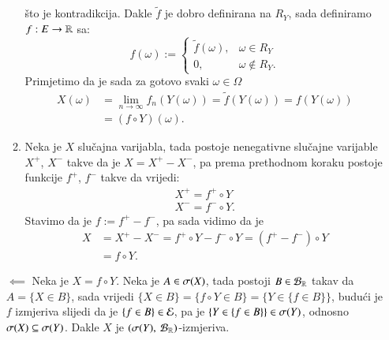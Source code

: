 \begin{rj}[\ref{zad:3.20}]
\begin{itemize}
\begin{enumerate}[label=(\arabic*. korak)]
\begin{equation*}
            \end{equation*}
            \v sto je kontradikcija.
            Dakle $\tilde{f}$ je dobro definirana na $R_Y$, sada definiramo $f : E \to \mathbb{R}$ sa:
            \begin{equation*}
                f(\omega) :=
                \begin{cases}
                    \tilde{f} (\omega), &\omega \in R_Y\\
                    0, &\omega \notin R_Y.
                \end{cases}
            \end{equation*}
            Primjetimo da je sada za gotovo svaki $\omega \in \Omega$
            \begin{equation*}
                \begin{aligned}
                X(\omega) &= \lim\limits_{n \to \infty} f_n (Y(\omega)) = \tilde{f}(Y(\omega)) = f(Y(\omega))\\
                &= (f \circ Y) (\omega).
                \end{aligned}
            \end{equation*}
            \item Neka je $X$ slu\v cajna varijabla, tada postoje nenegativne slu\v cajne varijable $X^+$, $X^-$ takve da je $X = X^+ - X^-$, pa prema prethodnom koraku postoje funkcije $f^+$, $f^-$ takve da vrijedi:
            \begin{equation*}
                \begin{aligned}
                   X^+ = f^+ \circ Y\\
                   X^- = f^- \circ Y.
                \end{aligned}
            \end{equation*}
            Stavimo da je $f:= f^+ - f^-$, pa sada vidimo da je
            \begin{equation*}
                \begin{aligned}
                    X &= X^+ - X^- = f^+ \circ Y - f^- \circ Y = (f^+ - f^-) \circ Y\\
                    &= f \circ Y.
                \end{aligned}
            \end{equation*}
        \end{enumerate}
        
        \item[$\impliedby$]
        Neka je $X = f \circ Y$. Neka je $A \in \sigma({X})$, tada postoji $B \in \mathcal{B}_{\mathbb{R}}$ takav da $A = \{ X \in B\}$, sada vrijedi $\{  X \in B \} = \{ f \circ Y \in B \} = \{ Y \in \{ f \in B \} \}$, budu\' ci je $f$ izmjeriva slijedi da je $\{f \in B\} \in \mathcal{E}$, pa je $\{Y \in \{ f \in B \}\} \in \sigma({Y})$, odnosno $\sigma({X}) \subseteq \sigma({Y})$.
        Dakle $X$ je $({\sigma({Y})}, \: {\mathcal{B}_{\mathbb{R}}})$-izmjeriva.
    \end{itemize}
\end{rj}

